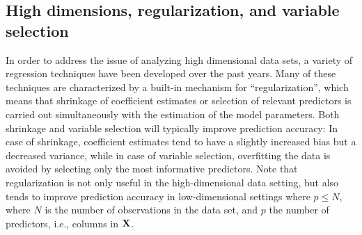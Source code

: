 \subsection{High dimensions, regularization, and variable selection}
In order to address the issue of analyzing high dimensional data sets, a variety of regression techniques have been developed over the past years. Many of these techniques are characterized by a built-in mechanism for ``regularization'', which means that shrinkage of coefficient estimates or selection of relevant predictors is carried out simultaneously with the estimation of the model parameters. Both shrinkage and variable selection will typically improve prediction accuracy: In case of shrinkage, coefficient estimates tend to have a slightly increased bias but a decreased variance, while in case of variable selection, overfitting the data is avoided by selecting only the most informative predictors. Note that regularization is not only useful in the high-dimensional data setting, but also tends to improve prediction accuracy in low-dimensional settings where $p\leq N$, where $N$ is the number of observations in the data set, and $p$ the number of predictors, i.e., columns in $\mathbf{X}$.

